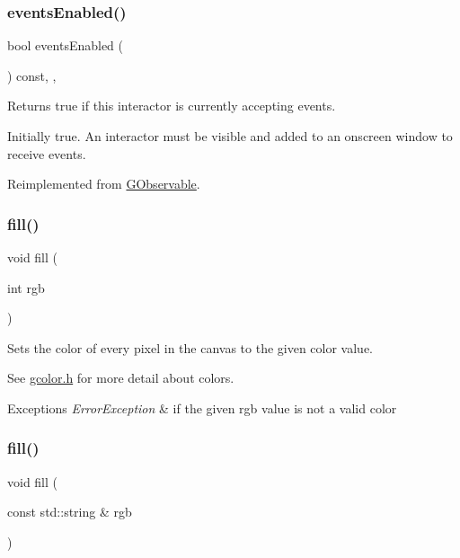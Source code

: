 \subsubsection{\texorpdfstring{events\+Enabled()}{eventsEnabled()}}
{\footnotesize\ttfamily bool events\+Enabled (\begin{DoxyParamCaption}{ }\end{DoxyParamCaption}) const\hspace{0.3cm}{\ttfamily [override]}, {\ttfamily [virtual]}, {\ttfamily [inherited]}}



Returns true if this interactor is currently accepting events. 

Initially true. An interactor must be visible and added to an onscreen window to receive events. 

Reimplemented from \mbox{\hyperlink{classGObservable_a8ebb3da91032e7f4c34485dabc518b8a}{G\+Observable}}.

\mbox{\label{classGCanvas_acaf90d64e4fea8f776e722976aeb5070}} 
\subsubsection{\texorpdfstring{fill()}{fill()}\hspace{0.1cm}{\footnotesize\ttfamily [1/2]}}
{\footnotesize\ttfamily void fill (\begin{DoxyParamCaption}\item[{int}]{rgb }\end{DoxyParamCaption})\hspace{0.3cm}{\ttfamily [virtual]}}



Sets the color of every pixel in the canvas to the given color value. 

See \mbox{\hyperlink{gcolor_8h_source}{gcolor.\+h}} for more detail about colors. 
\begin{DoxyExceptions}{Exceptions}
{\em Error\+Exception} & if the given rgb value is not a valid color \\
\hline
\end{DoxyExceptions}
\mbox{\label{classGCanvas_a02a5aa7f1474eeedd181e6e46b5eee65}} 
\subsubsection{\texorpdfstring{fill()}{fill()}\hspace{0.1cm}{\footnotesize\ttfamily [2/2]}}
{\footnotesize\ttfamily void fill (\begin{DoxyParamCaption}\item[{const std\+::string \&}]{rgb }\end{DoxyParamCaption})\hspace{0.3cm}{\ttfamily [virtual]}}



